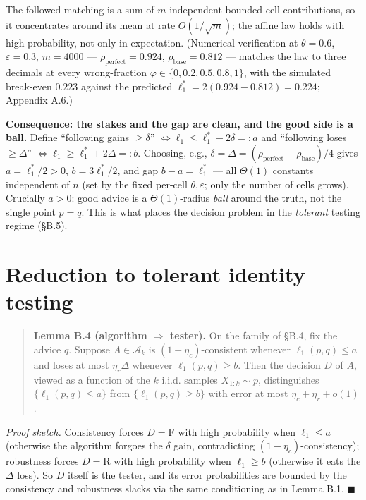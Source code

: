 The followed matching is a sum of \(m\) independent bounded cell
contributions, so it concentrates around its mean at rate
\(O(1/\sqrt m)\); the affine law holds with high probability, not only
in expectation. (Numerical verification at \(\theta=0.6\),
\(\varepsilon=0.3\), \(m=4000\) --- \(\rho_{\mathrm{perfect}}=0.924\),
\(\rho_{\mathrm{base}}=0.812\) --- matches the law to three decimals at
every wrong-fraction \(\varphi\in\{0,0.2,0.5,0.8,1\}\), with the
simulated break-even \(0.223\) against the predicted
\(\ell_1^*=2(0.924-0.812)=0.224\); Appendix A.6.)

\textbf{Consequence: the stakes and the gap are clean, and the good side
is a ball.} Define ``following gains \(\ge\delta\)''
\(\iff \ell_1\le \ell_1^*-2\delta =: a\) and ``following loses
\(\ge\Delta\)'' \(\iff \ell_1\ge \ell_1^*+2\Delta =: b\). Choosing,
e.g., \(\delta=\Delta=(\rho_{\mathrm{perfect}}-\rho_{\mathrm{base}})/4\)
gives \(a=\ell_1^*/2>0\), \(b=3\ell_1^*/2\), and gap \(b-a=\ell_1^*\)
--- all \(\Theta(1)\) constants independent of \(n\) (set by the fixed
per-cell \(\theta,\varepsilon\); only the number of cells grows).
Crucially \(a>0\): good advice is a \(\Theta(1)\)-radius \emph{ball}
around the truth, not the single point \(p=q\). This is what places the
decision problem in the \emph{tolerant} testing regime (§B.5).

\section{Reduction to tolerant identity
testing}

\begin{quote}
\textbf{Lemma B.4 (algorithm \(\Rightarrow\) tester).} On the family of
§B.4, fix the advice \(q\). Suppose \(A\in\mathcal A_k\) is
\((1-\eta_c)\)-consistent whenever \(\ell_1(p,q)\le a\) and loses at
most \(\eta_r\Delta\) whenever \(\ell_1(p,q)\ge b\). Then the decision
\(D\) of \(A\), viewed as a function of the \(k\) i.i.d. samples
\(X_{1:k}\sim p\), distinguishes \(\{\ell_1(p,q)\le a\}\) from
\(\{\ell_1(p,q)\ge b\}\) with error at most \(\eta_c+\eta_r+o(1)\).
\end{quote}

\emph{Proof sketch.} Consistency forces \(D=\mathrm F\) with high
probability when \(\ell_1\le a\) (otherwise the algorithm forgoes the
\(\delta\) gain, contradicting \((1-\eta_c)\)-consistency); robustness
forces \(D=\mathrm R\) with high probability when \(\ell_1\ge b\)
(otherwise it eats the \(\Delta\) loss). So \(D\) itself is the tester,
and its error probabilities are bounded by the consistency and
robustness slacks via the same conditioning as in Lemma B.1.
\(\blacksquare\)

